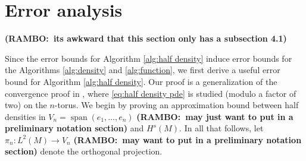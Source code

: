 \documentclass[final,leqno]{siamltex1213}
\newcommand{\ram}[1]{{\normalsize{\textbf{({\color{red}RAMBO:\ }#1)}}}}
\begin{document}
\section{Error analysis}
\ram{its awkward that this section only has a subsection 4.1}

Since the error bounds for Algorithm \ref{alg:half density} induce error bounds for the Algorithms \ref{alg:density} and \ref{alg:function}, we first derive a useful error bound for Algorithm \ref{alg:half density}.
Our proof is a generalization of the convergence proof in \cite{Pasciak1980}, where \eqref{eq:half density pde} is studied (modulo a factor of two) on the $n$-torus.
We begin by proving an approximation bound between half densities in $V_{n} = \operatorname{span}( e_{1},\dots,e_{n})$ \ram{may just want to put in a preliminary notation section} and $H^{s}(M)$.
In all that follows, let $\pi_{n}: L^{2}(M) \to V_{n}$ \ram{may want to put in a preliminary notation section} denote the orthogonal projection.
\end{document}
